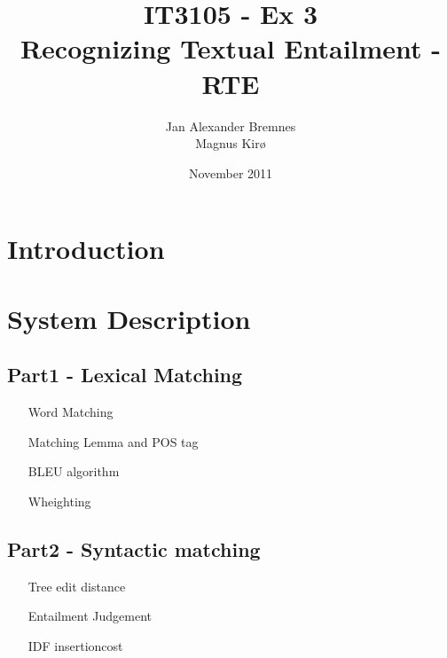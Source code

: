 \documentclass[titlepage]{article}
\author{Jan Alexander Bremnes\\Magnus Kirø}
\title{IT3105 - Ex 3\\Recognizing Textual Entailment - RTE}
\date{November 2011}
\begin{document}
    \maketitle
    \tableofcontents
    \graphicspath{{SRS/img/}}
    \newpage

\section{Introduction}

\section{System Description}

\subsection{Part1 - Lexical Matching}
    \begin{itemize}
        \item[Word Matching] 
        \item[Matching Lemma and POS tag]
        \item[BLEU algorithm]
        \item[Wheighting]
    \end{itemize}

\subsection{Part2 - Syntactic matching}
    \begin{itemize}
        \item[Tree edit distance] 
        \item[Entailment Judgement]
        \item[IDF insertioncost]
    \end{itemize}
\end{document}
